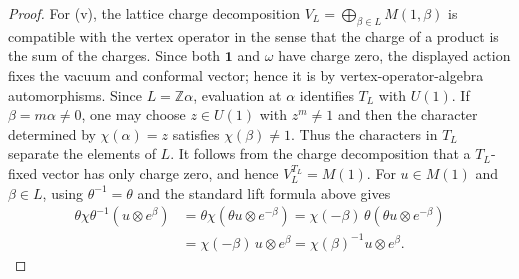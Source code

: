 \documentclass[12pt,leqno]{amsart}
\numberwithin{equation}{section} \newtheorem{thm}{Theorem}[section] \newtheorem{lem}[thm]{Lemma} \newtheorem{ex}[thm]{Example} \newtheorem{prop}[thm]{Proposition} \newtheorem{cor}[thm]{Corollary} \newtheorem{defi}[thm]{Definition} \newtheorem{rmk}[thm]{Remark} \newtheorem{notation}[thm]{Notation}
\newcommand{\one}{\mathbf{1}}
\begin{document}
\begin{proof}
For \textnormal{(v)}, the lattice charge decomposition $ V_L=\bigoplus_{\beta\in L}M(1,\beta) $ is compatible with the vertex operator in the sense that the charge of a product is the sum of the charges. Since both \(\one\) and \(\omega\) have charge zero, the displayed action fixes the vacuum and conformal vector; hence it is by vertex-operator-algebra automorphisms. Since \(L=\mathbb Z\alpha\), evaluation at \(\alpha\) identifies \(T_L\) with \(U(1)\). If \(\beta=m\alpha\ne0\), one may choose \(z\in U(1)\) with \(z^m\ne1\) and then the character determined by \(\chi(\alpha)=z\) satisfies \(\chi(\beta)\ne1\). Thus the characters in \(T_L\) separate the elements of \(L\). It follows from the charge decomposition that a \(T_L\)-fixed vector has only charge zero, and hence $ V_L^{T_L}=M(1). $ For \(u\in M(1)\) and \(\beta\in L\), using \(\theta^{-1}=\theta\) and the standard lift formula above gives $$
\begin{aligned}
\theta\chi\theta^{-1}(u\otimes e^\beta)
&=\theta\chi(\theta u\otimes e^{-\beta})=\chi(-\beta)\,\theta(\theta u\otimes e^{-\beta})\\
&=\chi(-\beta)\,u\otimes e^\beta=\chi(\beta)^{-1}u\otimes e^\beta.
\end{aligned}
$$
\end{proof}
\end{document}
